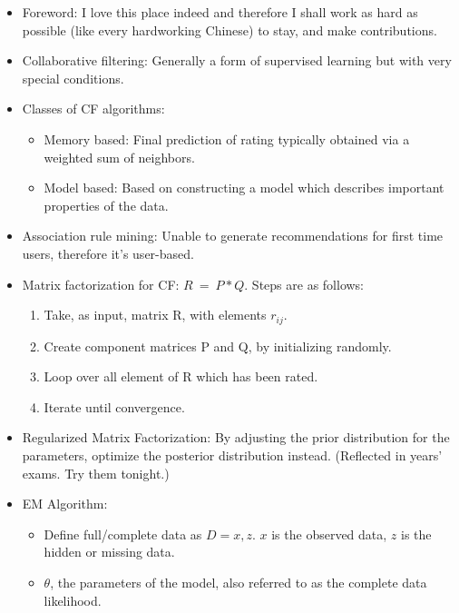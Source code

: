 \documentclass[twocolumn]{article}
\begin{document}
\begin{itemize}
\item Foreword: I love this place indeed and therefore I shall work as
  hard as possible (like every hardworking Chinese) to stay, and make
  contributions. 
\item Collaborative filtering: Generally a form of supervised learning
  but with very special conditions.
\item Classes of CF algorithms:
  \begin{itemize}
  \item Memory based: Final prediction of rating typically obtained
    via a weighted sum of neighbors.
  \item Model based: Based on constructing a model which describes
    important properties of the data.
  \end{itemize}
\item Association rule mining: Unable to generate recommendations for
  first time users, therefore it's user-based.
\item Matrix factorization for CF\@: $R~=~P\ast Q$. Steps are as
  follows:
  \begin{enumerate}
  \item Take, as input, matrix R, with elements $r_{ij}$.
  \item Create component matrices P and Q, by initializing randomly.
  \item Loop over all element of R which has been rated.
  \item Iterate until convergence.
  \end{enumerate}
\item Regularized Matrix Factorization: By adjusting the prior
  distribution for the parameters, optimize the posterior distribution
  instead. (Reflected in years' exams. Try them tonight.)
\item EM Algorithm: 
  \begin{itemize}
  \item Define full/complete data as $D={x,z}$. $x$ is the observed
    data, $z$ is the hidden or missing data.
  \item $\theta$, the parameters of the model, also referred to as the
    complete data likelihood.
  \end{itemize}

\end{itemize}
\end{document}
